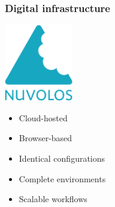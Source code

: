 \begin{frame}\frametitle{Digital infrastructure}\vspace{1.25cm}

	\begin{multicols}{2}

	\hspace{1.3cm}\includegraphics[width=0.225\textwidth]{material/crop-nuvolos}


	\begin{itemize}\setlength\itemsep{1em}
		\item Cloud-hosted
		\item Browser-based
    \item Identical configurations
    \item Complete environments
		\item Scalable workflows
  \end{itemize}
  	  \end{multicols}

\end{frame}
